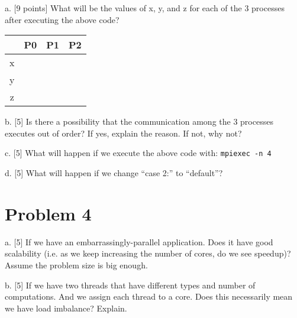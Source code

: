 \documentclass{article}
\begin{document}
a. [9 points] What will be the values of x, y, and z for each of the 3 processes after executing the above code?

\begin{tabular}{|c|c|c|c|}
\hline
 & P0 & P1 & P2 \\ \hline
x &  &  &  \\ \hline
y &  &  &  \\ \hline
z &  &  &  \\ \hline
\end{tabular}

b. [5] Is there a possibility that the communication among the 3 processes executes out of order? If yes, explain the reason. If not, why not?

c. [5] What will happen if we execute the above code with: \texttt{mpiexec -n 4}

d. [5] What will happen if we change ``case 2:'' to ``default''?


\section*{Problem 4}
a. [5] If we have an embarrassingly-parallel application. Does it have good scalability (i.e. as we keep increasing the number of cores, do we see speedup)? Assume the problem size is big enough.

b. [5] If we have two threads that have different types and number of computations. And we assign each thread to a core. Does this necessarily mean we have load imbalance? Explain.
\end{document}
